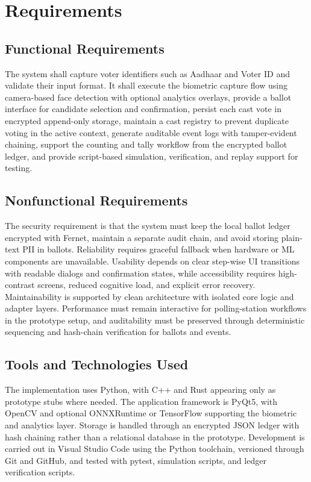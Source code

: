 \chapter{Requirements}

\section{Functional Requirements}
The system shall capture voter identifiers such as Aadhaar and Voter ID and validate their input format. It shall execute the biometric capture flow using camera-based face detection with optional analytics overlays, provide a ballot interface for candidate selection and confirmation, persist each cast vote in encrypted append-only storage, maintain a cast registry to prevent duplicate voting in the active context, generate auditable event logs with tamper-evident chaining, support the counting and tally workflow from the encrypted ballot ledger, and provide script-based simulation, verification, and replay support for testing.

\section{Nonfunctional Requirements}
The security requirement is that the system must keep the local ballot ledger encrypted with Fernet, maintain a separate audit chain, and avoid storing plain-text PII in ballots. Reliability requires graceful fallback when hardware or ML components are unavailable. Usability depends on clear step-wise UI transitions with readable dialogs and confirmation states, while accessibility requires high-contrast screens, reduced cognitive load, and explicit error recovery. Maintainability is supported by clean architecture with isolated core logic and adapter layers. Performance must remain interactive for polling-station workflows in the prototype setup, and auditability must be preserved through deterministic sequencing and hash-chain verification for ballots and events.

\section{Tools and Technologies Used}
The implementation uses Python, with C++ and Rust appearing only as prototype stubs where needed. The application framework is PyQt5, with OpenCV and optional ONNXRuntime or TensorFlow supporting the biometric and analytics layer. Storage is handled through an encrypted JSON ledger with hash chaining rather than a relational database in the prototype. Development is carried out in Visual Studio Code using the Python toolchain, versioned through Git and GitHub, and tested with pytest, simulation scripts, and ledger verification scripts.

